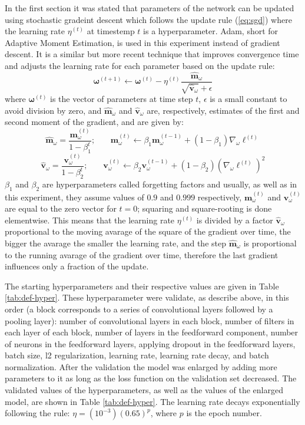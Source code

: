 \documentclass[12pt]{article}
\newcommand{\vect}[1]{\boldsymbol{#1}}
\begin{document}
In the first section it was stated that parameters of the network can be updated using stochastic gradeint descent which follows the update rule (\ref{eq:sgd}) where the learning rate $\eta^{(t)}$ at timestemp $t$ is a hyperparameter. Adam, short for Adaptive Moment Estimation, is used in this experiment instead of gradient descent. It is a similar but more recent technique that improves convergence time and adjusts the learning rate for each parameter based on the update rule:
$$
\vect{\omega}^{(t+1)}\leftarrow \vect{\omega}^{(t)}-\eta^{(t)} {\frac {\vect{{\hat {m}}}_{\omega}}{{\sqrt {\vect{{\hat {v}}}_{\omega}}}+\epsilon }}
$$
where $\vect{\omega}^{(t)}$ is the vector of parameters at time step $t$, $\epsilon$ is a small constant to avoid division by zero, and	 $\vect{{\hat {m}}}_{\omega}$ and $\vect{{\hat {v}}}_{\omega}$ are, respectively, estimates of the first and second moment of the gradient, and are given by:
$$
\vect{\hat {m}}_{\omega}={\frac {\vect{m}_{\omega}^{(t)}}{1-\beta _{1}^{t}}} \text{;}\qquad
\vect{m}_{\omega}^{(t)}\leftarrow \beta _{1}\vect{m}_{\omega}^{(t-1)}+(1-\beta _{1})\nabla _{\omega}\ell^{(t)}
$$
$$
\vect{\hat {v}}_{\omega}={\frac {\vect{v}_{\omega}^{(t)}}{1-\beta _{2}^{t}}} \text{;}\qquad
\vect{v}_{\omega}^{(t)}\leftarrow \beta _{2}\vect{v}_{\omega}^{(t-1)}+(1-\beta _{2})(\nabla _{\omega}\ell^{(t)})^2
$$
$\beta_{1}$ and $\beta_{2}$ are hyperparameters called forgetting factors and usually, as well as in this experiment, they assume values of $0.9$ and $0.999$ respectively, $ \vect{m}_{\omega}^{(t)}$ and $ \vect{v}_{\omega}^{(t)}$ are equal to the zero vector for $t=0$; squaring and square-rooting is done elementwise. This means that the learning rate $\eta^{(t)}$ is divided by a factor $\vect{\hat {v}}_{\omega}$ proportional to the moving avarage of the square of the gradient over time, the bigger the avarage the smaller the learning rate, and the step $\vect{\hat {m}}_{\omega}$ is proportional to the running avarage of the gradient over time, therefore the last gradient influences only a fraction of the update.

The starting hyperparameters and their respective values are given in Table \ref{tab:def-hyper}. These hyperparameter were validate, as describe above, in this order (a block corresponds to a series of convolutional layers followed by a pooling layer): number of convolutional layers in each block, number of filters in each layer of each block, number of layers in the feedforward component, number of neurons in the feedforward layers, applying dropout in the feedforward layers, batch size, l2 regularization, learning rate, learning rate decay, and batch normalization. After the validation the model was enlarged by adding more parameters to it as long as the loss function on the validation set decreased. The validated values of the hyperparameters, as well as the values of the enlarged model, are shown in Table \ref{tab:def-hyper}. The learning rate decays exponentially following the rule: $ \eta = (10^{-3})(0.65)^{p} $, where $p$ is the epoch number.
\end{document}
